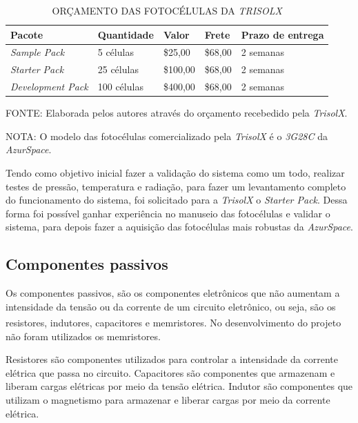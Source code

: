 \documentclass[
	12pt,				%
	openright,			%
	oneside,			%
	a4paper,			%
	english,			%
	french,				%
	spanish,			%
	brazil,				%
	oldfontcommands
	]{abntex2}
\begin{document}
	\begin{table}[th]
	\caption{ORÇAMENTO DAS FOTOCÉLULAS DA \textit{TRISOLX}}
	\centering
	\begin{tabular}{p{3.5cm}|p{2.5cm}|p{1.5cm}|p{1.5cm}|p{2.0cm}}
		\textbf{Pacote} & \textbf{Quantidade} & \textbf{Valor} & \textbf{Frete} & \textbf{Prazo de entrega}\\
		\hline
		\textit{Sample Pack} & 5 células & \$25,00 &  \$68,00 & 2 semanas\\
		\textit{Starter Pack} & 25 células & \$100,00 &  \$68,00 & 2 semanas\\
		\textit{Development Pack} & 100 células & \$400,00 & \$68,00 & 2 semanas\\
	\end{tabular}
	
	\begin{small}
	\vspace{3pt}
		FONTE: Elaborada pelos autores através do orçamento recebedido pela \textit{TrisolX}.
	\end{small}
	
	\begin{footnotesize}
		NOTA: O modelo das fotocélulas comercializado pela \textit{TrisolX} é o \textit{3G28C} da \textit{AzurSpace}.
	\end{footnotesize}
	\end{table}	
	
	Tendo como objetivo inicial fazer a validação do sistema como um todo, realizar testes de pressão, temperatura e radiação, para fazer um levantamento completo do funcionamento do sistema, foi solicitado para a \textit{TrisolX} o \textit{Starter Pack}. Dessa forma foi possível ganhar experiência no manuseio das fotocélulas e validar o sistema, para depois fazer a aquisição das fotocélulas mais robustas da \textit{AzurSpace}.
	
\subsection[Componentes passivos]{Componentes passivos}

	Os componentes passivos, são os componentes eletrônicos que não aumentam a intensidade da tensão ou da corrente de um circuito eletrônico, ou seja, são os resistores, indutores, capacitores e memristores.\textsuperscript{\cite{Passivo}} No desenvolvimento do projeto não foram utilizados os memristores.
	
	Resistores são componentes utilizados para controlar a intensidade da corrente elétrica que passa no circuito. Capacitores são componentes que armazenam e liberam cargas elétricas por meio da tensão elétrica. Indutor são componentes que utilizam o magnetismo para armazenar e liberar cargas por meio da corrente elétrica.
\end{document}
